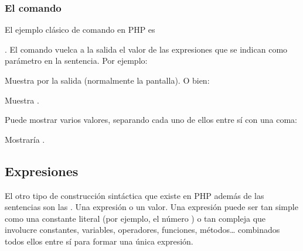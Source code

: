 \documentclass[a4paper,12pt,spanish]{sphinxmanual}
\begin{document}
\subsubsection{El comando }
\label{\detokenize{php:el-comando-echo}}
\ignorespaces 
El ejemplo clásico de comando en PHP es %
\begin{footnote}[1]\sphinxAtStartFootnote
{}
%
\end{footnote}. El comando  vuelca a
la salida el valor de las expresiones que se indican como parámetro en la
sentencia. Por ejemplo:

%
\begin{sphinxVerbatim}[commandchars=\\\{\}]
   
\end{sphinxVerbatim}

Muestra  por la salida (normalmente la pantalla). O bien:

%
\begin{sphinxVerbatim}[commandchars=\\\{\}]
 
\end{sphinxVerbatim}

Muestra .

Puede mostrar varios valores, separando cada uno de ellos entre sí con una
coma:

%
\begin{sphinxVerbatim}[commandchars=\\\{\}]
    
\end{sphinxVerbatim}

Mostraría .

\ignorespaces 

\subsection{Expresiones}
\label{\detokenize{php:expresiones}}\label{\detokenize{php:index-7}}
El otro tipo de construcción sintáctica que existe en PHP además de las
sentencias son las . Una expresión  o  un
valor. Una expresión puede ser tan simple como una constante literal (por
ejemplo, el número ) o tan compleja que involucre constantes, variables,
operadores, funciones, métodos… combinados todos ellos entre sí para formar
una única expresión.
\end{document}
